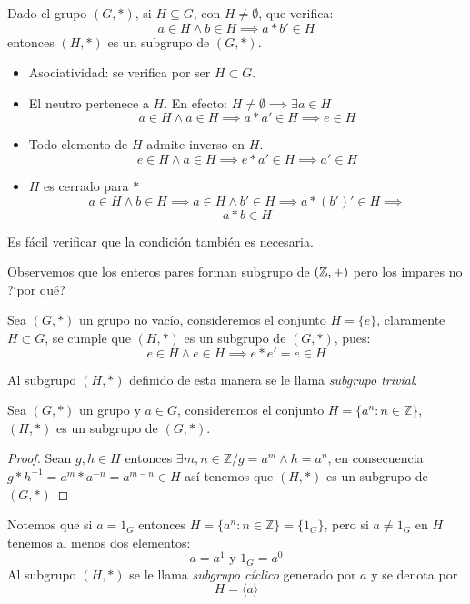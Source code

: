 	\begin{fmd-theorem} \label{teo:subgrupo}
		Dado el grupo $(G, *)$, si $H \subseteq G$, con $H \ne \emptyset$, que verifica:
		\[ a \in H \land b \in H \implies a * b' \in H\]
		entonces $(H, *)$ es un subgrupo de $(G, *)$.
	\end{fmd-theorem}

	\begin{fmd-proof}
		\begin{itemize}
			\item Asociatividad: se verifica por ser $H \subset G$.
			\item El neutro pertenece a $H$. En efecto: $H \ne \emptyset \implies \exists a \in H$
			\vspace{-3mm}
			\[a \in H \land a \in H \implies a*a'\in H \implies e \in H\]
			\item Todo elemento de $H$ admite inverso en $H$.
			\vspace{-3mm}
			\[ e \in H \land a \in H \implies e * a' \in H \implies a'\in H \]
			\item $H$ es cerrado para $*$
			\vspace{-3mm}
			\[ a \in H \land b \in H \implies a \in H \land b' \in H \implies a*(b')' \in H \implies \]
			\[ a*b \in H\]
		\end{itemize}
	\end{fmd-proof}
	Es fácil verificar que la condición también es necesaria.
	
Observemos que los enteros pares forman subgrupo de $(\mathbb{Z}, +)$ pero los impares no ?`por qué?

\begin{definition}
	Sea $(G, *)$ un grupo no vacío, consideremos el conjunto $H = \{ e \}$, claramente $H \subset G$, se cumple que $(H, *)$ es un subgrupo de $(G, *)$, pues:
	\[ e \in H \land e \in H \implies e * e' = e \in H \]
	
	Al subgrupo $(H, *)$ definido de esta manera se le llama \textit{subgrupo trivial}.
\end{definition}

\begin{fmd-definition}
	Sea $(G, *)$ un grupo y $a \in G$, consideremos el conjunto $H = \{ a^n: n \in \mathbb{Z}\}$, $(H, *)$ es un subgrupo de $(G, *)$.
	
	\begin{proof}
		Sean $g, h \in H$ entonces $ \exists m, n \in \mathbb{Z} / g = a^m \land h = a^n$, en consecuencia $g*h^{-1} = a^m * a^{-n} = a^{m-n} \in H $
		así tenemos que $(H, *)$ es un subgrupo de $(G,*)$
	\end{proof}
	Notemos que si $a=1_G$ entonces $H=\{a^n:n \in \mathbb{Z}\} = \{1_G\}$, pero si $a\neq 1_G$ en $H$ tenemos al menos dos elementos:
	\[ a = a^1 \mbox{ y } 1_G = a^0 \]
	Al subgrupo $(H, *)$ se le llama \textit{subgrupo cíclico} generado por $a$ y se denota por
	\[ H = \langle a \rangle \]
\end{fmd-definition}
	
